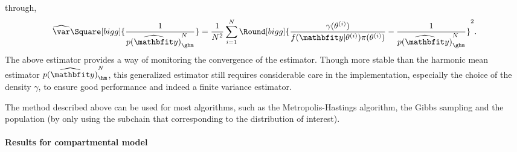 through,
\begin{equation}
  \widehat{\var}\Square[bigg]{\frac{1}{\widehat{p(\data)}_{\ghm}^N}} =
  \frac{1}{N^2}\sum_{i=1}^N \Round[bigg]{
    \frac{\gamma(\theta^{(i)})}{f(\data|\theta^{(i)})\pi(\theta^{(i)})}
    - \frac{1}{\widehat{p(\data)}_{\ghm}^N}}^2.
\end{equation}
The above estimator provides a way of monitoring the convergence of the
estimator. Though more stable than the harmonic mean estimator
$\widehat{p(\data)}_{\hm}^N$, this generalized estimator still requires
considerable care in the implementation, especially the choice of the density
$\gamma$, to ensure good performance and indeed a finite variance estimator.

The method described above can be used for most \mcmc algorithms, such as the
Metropolis-Hastings algorithm, the Gibbs sampling and the population \mcmc (by
only using the subchain that corresponding to the distribution of interest).

\paragraph{Results for \pet compartmental model}

